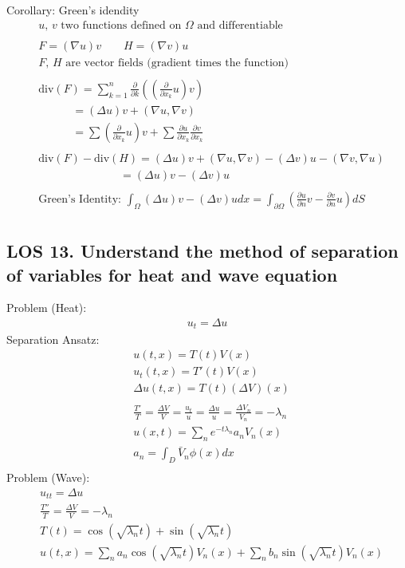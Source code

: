 \documentclass[12pt, a4paper]{article}
\begin{document}
Corollary: Green's idendity
\begin{align*}
    &\text{$u$, $v$ two functions defined on $\Omega$ and differentiable}\\\\
    &F=(\nabla u)v \qquad H=(\nabla v)u\\
    &\text{$F$, $H$ are vector fields (gradient times the function)}\\\\
    &\text{div}(F) = \sum_{k=1}^{n}\frac{\partial }{\partial k}\left(\left(\frac{\partial}{\partial x_k}u\right)v\right)\\
    &\qquad\quad =(\Delta u)v + (\nabla u, \nabla v)\\
    &\qquad\quad =\sum\left(\frac{\partial}{\partial x_k}u\right)v+\sum \frac{\partial u}{\partial x_k} \frac{\partial v}{\partial x_k}\\\\
    &\text{div}(F) - \text{div}(H)=(\Delta u)v + (\nabla u, \nabla v) - (\Delta v)u - (\nabla v, \nabla u)\\
    &\qquad\qquad\qquad\quad\; = (\Delta u)v - (\Delta v)u\\\\
    &\text{Green's Identity: } \int_{\Omega} (\Delta u)v - (\Delta v)u dx = \int_{\partial\Omega} \left(\frac{\partial u}{\partial n}v-\frac{\partial v}{\partial n}u \right)dS\\
\end{align*}

\subsection*{LOS 13. Understand the method of separation of variables for heat and wave equation}
Problem (Heat):
\begin{align*}
    u_t = \Delta u
\end{align*}
Separation Ansatz:
\begin{align*}
    &u(t, x) = T(t)V(x)\\
    &u_t(t, x) = T'(t)V(x)\\
    &\Delta u(t, x) = T(t)(\Delta V)(x)\\\\
    &\frac{T'}{T}=\frac{\Delta V}{V} = \frac{u_t}{u} = \frac{\Delta u}{u} = \frac{\Delta V_n}{V_n} = -\lambda_n\\
    &u(x, t) = \sum_n e^{-t\lambda_n}a_nV_n(x)\\
    &a_n = \int_D \bar{V}_n \phi(x)dx\\
\end{align*}
Problem (Wave):
\begin{align*}
    &u_{tt} = \Delta u\\
    &\frac{T''}{T}=\frac{\Delta V}{V} = -\lambda_n\\
    &T(t) = \cos(\sqrt{\lambda_n}t)+\sin(\sqrt{\lambda_n}t)\\
    &u(t, x) =  \sum_na_n\cos(\sqrt{\lambda_n}t)V_n(x)+\sum_nb_n\sin(\sqrt{\lambda_n}t)V_n(x)
\end{align*}
\vspace{0.3em}
\end{document}
